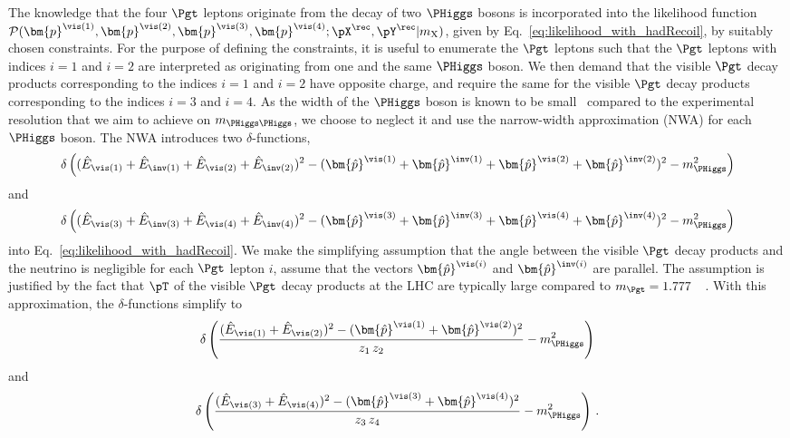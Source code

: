 The knowledge that the four $\Pgt$ leptons originate from the decay of two $\PHiggs$ bosons is incorporated into the likelihood function 
$\mathcal{P}(\bm{p}^{\vis(1)},\bm{p}^{\vis(2)},\bm{p}^{\vis(3)},\bm{p}^{\vis(4)};\pX^{\rec},\pY^{\rec}|m_{\textrm{X}})$,
given by Eq.~\ref{eq:likelihood_with_hadRecoil}, by suitably chosen constraints.
For the purpose of defining the constraints, it is useful to enumerate the $\Pgt$ leptons 
such that the $\Pgt$ leptons with indices $i=1$ and $i=2$ are interpreted as originating from one and the same $\PHiggs$ boson.
We then demand that the visible $\Pgt$ decay products corresponding to the indices $i=1$ and $i=2$ have opposite charge,
and require the same for the visible $\Pgt$ decay products corresponding to the indices $i=3$ and $i=4$.
As the width of the $\PHiggs$ boson is known to be small~\cite{HIG-14-002,Aad:2015xua} compared to the experimental resolution that we aim to achieve on $m_{\PHiggs\PHiggs}$,
we choose to neglect it and use the narrow-width approximation (NWA) for each $\PHiggs$ boson.
The NWA introduces two $\delta$-functions, 
\begin{equation*}
\delta\left( (\hat{E}_{\vis(1)} + \hat{E}_{\inv(1)} + \hat{E}_{\vis(2)} + \hat{E}_{\inv(2)})^{2} - (\bm{\hat{p}}^{\vis(1)} + \bm{\hat{p}}^{\inv(1)} + \bm{\hat{p}}^{\vis(2)} + \bm{\hat{p}}^{\inv(2)})^{2} - m_{\PHiggs}^{2} \right)
\end{equation*}
and 
\begin{equation*}
\delta\left( (\hat{E}_{\vis(3)} + \hat{E}_{\inv(3)} + \hat{E}_{\vis(4)} + \hat{E}_{\inv(4)})^{2} - (\bm{\hat{p}}^{\vis(3)} + \bm{\hat{p}}^{\inv(3)} + \bm{\hat{p}}^{\vis(4)} + \bm{\hat{p}}^{\inv(4)})^{2} - m_{\PHiggs}^{2} \right)
\end{equation*}
into Eq.~\ref{eq:likelihood_with_hadRecoil}.
We make the simplifying assumption that the angle between the visible $\Pgt$ decay products and the neutrino is negligible for each $\Pgt$ lepton $i$,
\ie assume that the vectors $\bm{\hat{p}}^{\vis(i)}$ and $\bm{\hat{p}}^{\inv(i)}$ are parallel.
The assumption is justified by the fact that $\pT$ of the visible $\Pgt$ decay products at the LHC are typically large compared to $m_{\Pgt} = 1.777$~\GeV~\cite{PDG}.
With this approximation, the $\delta$-functions simplify to 
\begin{equation*}
\delta\left(\frac{(\hat{E}_{\vis(1)} + \hat{E}_{\vis(2)})^{2} - (\bm{\hat{p}}^{\vis(1)} + \bm{\hat{p}}^{\vis(2)})^{2}}{z_{1} \, z_{2}} - m_{\PHiggs}^{2}\right)
\end{equation*}
and 
\begin{equation*}
\delta\left(\frac{(\hat{E}_{\vis(3)} + \hat{E}_{\vis(4)})^{2} - (\bm{\hat{p}}^{\vis(3)} + \bm{\hat{p}}^{\vis(4)})^{2}}{z_{3} \, z_{4}} - m_{\PHiggs}^{2}\right) \, .
\end{equation*}
